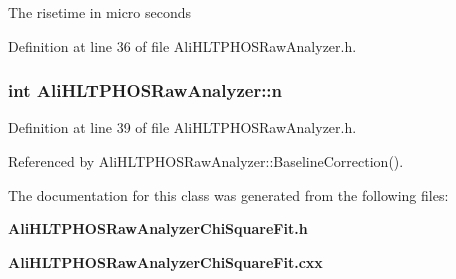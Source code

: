 The risetime in micro seconds 

Definition at line 36 of file Ali\-HLTPHOSRaw\-Analyzer.h.
\subsubsection{\setlength{\rightskip}{0pt plus 5cm}int {\bf Ali\-HLTPHOSRaw\-Analyzer::n}\hspace{0.3cm}{\tt  [protected, inherited]}}\label{classAliHLTPHOSRawAnalyzer_AliHLTPHOSRawAnalyzerPeakFinderp7}




Definition at line 39 of file Ali\-HLTPHOSRaw\-Analyzer.h.

Referenced by Ali\-HLTPHOSRaw\-Analyzer::Baseline\-Correction().

The documentation for this class was generated from the following files:\begin{CompactItemize}
\item 
{\bf Ali\-HLTPHOSRaw\-Analyzer\-Chi\-Square\-Fit.h}\item 
{\bf Ali\-HLTPHOSRaw\-Analyzer\-Chi\-Square\-Fit.cxx}\end{CompactItemize}
